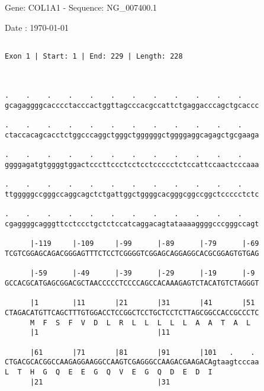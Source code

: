 \documentclass{article}
\begin{document}
\begin{center}
\begin{large}
 Gene: COL1A1 - Sequence: NG\_007400.1
 
 Date : \today
\end{large}
\end{center}
 \begin{Verbatim}
 
Exon 1 | Start: 1 | End: 229 | Length: 228



.    .    .    .    .    .    .    .    .    .    .    .    
gcagaggggcacccctacccactggttagcccacgccattctgaggacccagctgcaccc
                                                            
.    .    .    .    .    .    .    .    .    .    .    .    
ctaccacagcacctctggcccaggctgggctggggggctggggaggcagagctgcgaaga
                                                            
.    .    .    .    .    .    .    .    .    .    .    .    
ggggagatgtggggtggactcccttccctcctcctccccctctccattccaactcccaaa
                                                            
.    .    .    .    .    .    .    .    .    .    .    .    
ttgggggccgggccaggcagctctgattggctggggcacgggcggccggctccccctctc
                                                            
.    .    .    .    .    .    .    .    .    .    .    .    
cgaggggcagggttcctccctgctctccatcaggacagtataaaaggggcccgggccagt
                                                            
      |-119     |-109     |-99      |-89      |-79      |-69
TCGTCGGAGCAGACGGGAGTTTCTCCTCGGGGTCGGAGCAGGAGGCACGCGGAGTGTGAG
                                                            
      |-59      |-49      |-39      |-29      |-19      |-9 
GCCACGCATGAGCGGACGCTAACCCCCTCCCCAGCCACAAAGAGTCTACATGTCTAGGGT
                                                            
      |1        |11       |21       |31       |41       |51 
CTAGACATGTTCAGCTTTGTGGACCTCCGGCTCCTGCTCCTCTTAGCGGCCACCGCCCTC
      M  F  S  F  V  D  L  R  L  L  L  L  L  A  A  T  A  L  
      |1                            |11                     
  
      |61       |71       |81       |91       |101   .    . 
CTGACGCACGGCCAAGAGGAAGGCCAAGTCGAGGGCCAAGACGAAGACAgtaagtcccaa
L  T  H  G  Q  E  E  G  Q  V  E  G  Q  D  E  D  I           
      |21                           |31                     
  

\end{Verbatim}
\end{document}

